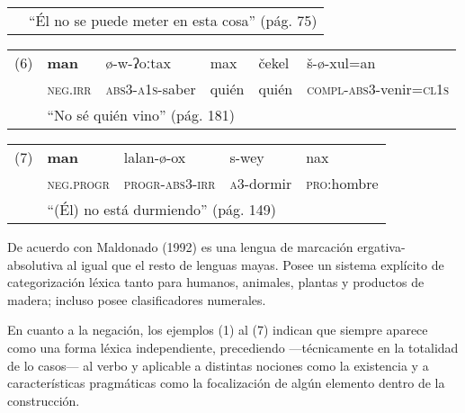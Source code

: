 {\begin{table}[H]
\begin{tabular}{rlllllllll}
                                                & \multicolumn{9}{l}{“Él no se puede meter en esta cosa” (pág. 75)}                                                                                                                       \\
                  \end{tabular}%
            \end{table}%
            \begin{table}[H]
                  \begin{tabular}{rlllll}
                        \multicolumn{1}{l}{(6)} & \textbf{man}                                      & ø-w-ʔoːtax              & max   & čekel & š-ø-xul=an                              \\
                                                & \textsc{neg.irr}                                  & \textsc{abs3-a1s}-saber & quién & quién & \textsc{compl-abs3}-venir=\textsc{cl1s} \\
                                                & \multicolumn{5}{l}{“No sé quién vino” (pág. 181)}                                                                                     \\
                  \end{tabular}%

            \end{table}%
            \begin{table}[H]
                  \begin{tabular}{rllll}
                        \multicolumn{1}{l}{(7)} & \textbf{man}                                            & lalan-ø-ox              & s-wey              & nax                 \\
                                                & \textsc{neg.progr}                                      & \textsc{progr-abs3-irr} & \textsc{a3}-dormir & \textsc{pro}:hombre \\
                                                & \multicolumn{4}{l}{“(Él) no está durmiendo” (pág. 149)}                                                                      \\
                  \end{tabular}%
            \end{table}%

            De acuerdo con Maldonado (1992) es una lengua de marcación ergativa-absolutiva al igual que el resto de lenguas mayas. Posee un sistema explícito de categorización léxica tanto para humanos, animales, plantas y productos de madera; incluso posee clasificadores numerales.

            En cuanto a la negación, los ejemplos (1) al (7) indican que siempre aparece como una forma léxica independiente, precediendo —técnicamente en la totalidad de lo casos— al verbo y aplicable a distintas nociones como la existencia y a características pragmáticas como la focalización de algún elemento dentro de la construcción.

      }